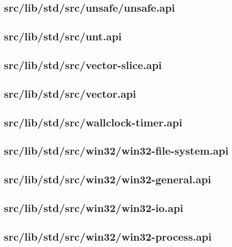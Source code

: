 \subsection{src/lib/std/src/unsafe/unsafe.api}


\subsection{src/lib/std/src/unt.api}


\subsection{src/lib/std/src/vector-slice.api}


\subsection{src/lib/std/src/vector.api}


\subsection{src/lib/std/src/wallclock-timer.api}


\subsection{src/lib/std/src/win32/win32-file-system.api}


\subsection{src/lib/std/src/win32/win32-general.api}


\subsection{src/lib/std/src/win32/win32-io.api}


\subsection{src/lib/std/src/win32/win32-process.api}



